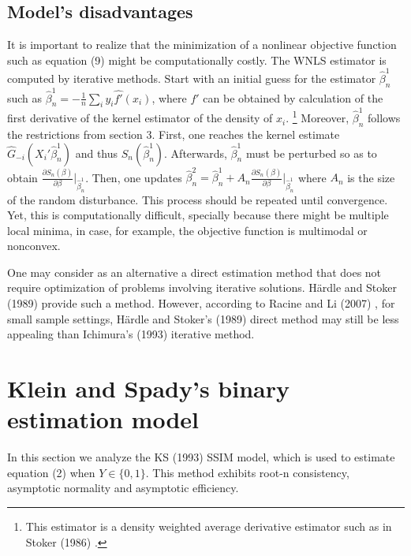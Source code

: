 \documentclass[a4paper]{article}
\begin{document}


\subsection{Model's disadvantages} %
\label{sub:Model's disadvantages}


It is important to realize that the minimization of a nonlinear objective function such as equation (9) might be computationally costly. The WNLS estimator is computed by iterative methods. Start with an initial guess for the estimator $\hat{\beta}_n^{1}$ such as $\hat{\beta}_n^{1} = - \frac{1}{n}\sum_i y_i\hat{f'}(x_i)$, where $f'$ can be obtained by calculation of the first derivative of the kernel estimator of the density of $x_i$. \footnote{This estimator is a density weighted average derivative estimator such as in Stoker (1986) \cite{[21]}.} Moreover, $\hat{\beta}_n^{1}$ follows the restrictions from section 3. First, one reaches the kernel estimate $\hat{G}_{-i}(X_i'\hat{\beta}_n^{1})$ and thus $S_n(\hat{\beta}_n^{1})$. Afterwards, $\hat{\beta}_n^{1}$ must be perturbed so as to obtain $\frac{\partial S_n(\beta)}{\partial\beta} |_{\hat{\beta}_n^{1}}$. Then, one updates $\hat{\beta}_n^{2} = \hat{\beta}_n^{1} + A_n  \frac{ \partial S_n(\beta)}{\partial\beta}|_{\hat{\beta}_n^{1}}$ where $A_n$ is the size of the random disturbance. This process should be repeated until convergence. Yet, this is computationally difficult, specially because there might be multiple local minima, in case, for example, the objective function is multimodal or nonconvex. 

One may consider  as an alternative a direct estimation method that does not require optimization of problems involving iterative solutions.  H{\"a}rdle and Stoker (1989) \cite{[22]} provide such a method. However, according to Racine and Li (2007) \cite{[1]}, for small sample settings, H{\"a}rdle and Stoker's (1989) \cite{[22]} direct method may still be less appealing than Ichimura's (1993) \cite{[6]} iterative method.

\section{Klein and Spady's binary estimation model} %
\label{sec:section_about_references_within_the_document}
In this section we analyze the KS (1993) \cite{[12]} SSIM model, which is used to estimate equation (2) when $Y \in \{0,1\}$. This method exhibits root-n consistency, asymptotic normality and asymptotic efficiency. 
\end{document}

